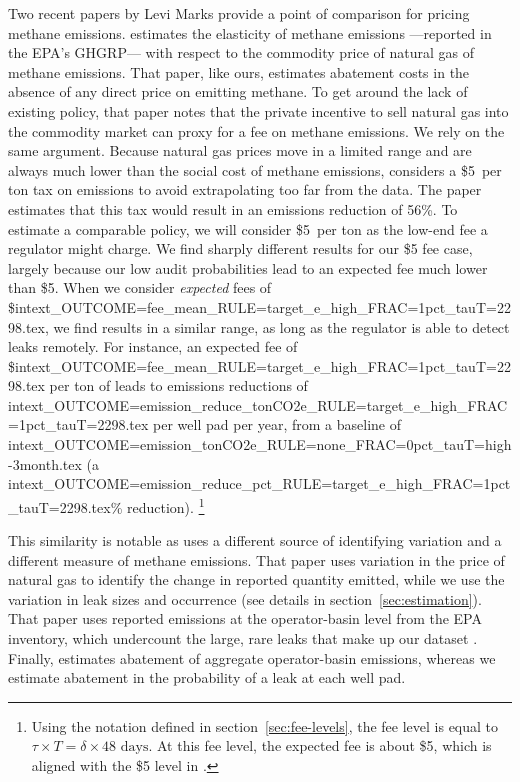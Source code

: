 Two recent papers by Levi Marks provide a point of comparison for pricing methane emissions.
\textcite{Marks:2021} estimates the elasticity of methane emissions%
---reported in the \gls{EPA}'s \gls{GHGRP}---%
with respect to  the commodity price of natural gas of methane emissions.
That paper, like ours, estimates abatement costs in the absence of any direct price on emitting methane.
To get around the lack of existing policy, that paper notes that the private incentive to sell natural gas into the commodity market can proxy for a fee on methane emissions.
We rely on the same argument.
Because natural gas prices move in a limited range and are always much lower than the social cost of methane emissions, \textcite{Marks:2021} considers a \$5~per ton  tax on emissions to avoid extrapolating too far from the data.
The paper estimates that this tax would result in an emissions reduction of 56\%.
To estimate a comparable policy, we will consider \$5~per ton  as the low-end fee a regulator might charge.
We find sharply different results for our \$5 fee case, largely because our low audit probabilities lead to an expected fee much lower than \$5.
When we consider \emph{expected} fees of
\${intext_OUTCOME=fee_mean_RULE=target_e_high_FRAC=1pct_tauT=2298.tex},
we find results in a similar range, as long as the regulator is able to detect leaks remotely.
For instance, an expected fee of
\${intext_OUTCOME=fee_mean_RULE=target_e_high_FRAC=1pct_tauT=2298.tex}
per ton of 
leads to emissions reductions of
{intext_OUTCOME=emission_reduce_tonCO2e_RULE=target_e_high_FRAC=1pct_tauT=2298.tex}
 per well pad per year, from a baseline of
{intext_OUTCOME=emission_tonCO2e_RULE=none_FRAC=0pct_tauT=high-3month.tex}
(a {intext_OUTCOME=emission_reduce_pct_RULE=target_e_high_FRAC=1pct_tauT=2298.tex}\%
reduction).%
\footnote{%
Using the notation defined in section~\ref{sec:fee-levels}, the fee level is equal to \(\tau \times T = \delta \times \text{48 days}\).
At this fee level, the expected fee is about \$5, which is aligned with the \$5 level in \textcite{Marks:2021}.
}

This similarity is notable as \textcite{Marks:2021} uses a different source of identifying variation and a different measure of methane emissions.
That paper uses variation in the price of natural gas to identify the change in reported quantity emitted, while we  use the variation in leak sizes and occurrence
(see details in section~\ref{sec:estimation}).
That paper uses reported emissions at the operator-basin level from the \gls{EPA} inventory, which undercount the large, rare leaks that make up our dataset \parencite{Robertson/etal:2020}.
Finally, \textcite{Marks:2021} estimates abatement of aggregate operator-basin emissions, whereas we estimate abatement in the probability of a leak at each well pad.

